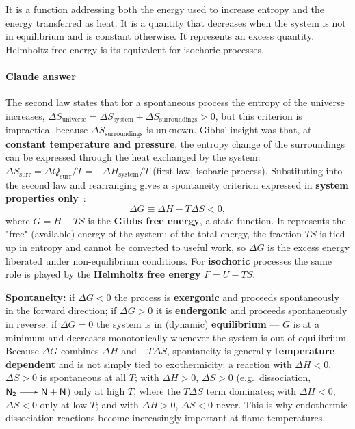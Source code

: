It is a function addressing both the energy used to increase entropy and the energy transferred as heat. It is a quantity that decreases when the system is not in equilibrium and is constant otherwise. It represents an excess quantity. Helmholtz free energy is its equivalent for isochoric processes.

{\color{istblue}
\paragraph{Claude answer}
The second law states that for a spontaneous process the entropy of the universe increases, $\Delta S_{\mathrm{universe}} = \Delta S_{\mathrm{system}} + \Delta S_{\mathrm{surroundings}} > 0$, but this criterion is impractical because $\Delta S_{\mathrm{surroundings}}$ is unknown. Gibbs' insight was that, at \textbf{constant temperature and pressure}, the entropy change of the surroundings can be expressed through the heat exchanged by the system: $\Delta S_{\mathrm{surr}} = \Delta Q_{\mathrm{surr}}/T = -\Delta H_{\mathrm{system}}/T$ (first law, isobaric process). Substituting into the second law and rearranging gives a spontaneity criterion expressed in \textbf{system properties only}~\cite{lecture2}:
\begin{equation*}
\Delta G \equiv \Delta H - T\Delta S < 0,
\end{equation*}
where $G = H - TS$ is the \textbf{Gibbs free energy}, a state function. It represents the "free" (available) energy of the system: of the total energy, the fraction $TS$ is tied up in entropy and cannot be converted to useful work, so $\Delta G$ is the excess energy liberated under non-equilibrium conditions. For \textbf{isochoric} processes the same role is played by the \textbf{Helmholtz free energy} $F = U - TS$.

\textbf{Spontaneity:} if $\Delta G < 0$ the process is \textbf{exergonic} and proceeds spontaneously in the forward direction; if $\Delta G > 0$ it is \textbf{endergonic} and proceeds spontaneously in reverse; if $\Delta G = 0$ the system is in (dynamic) \textbf{equilibrium} --- $G$ is at a minimum and decreases monotonically whenever the system is out of equilibrium. Because $\Delta G$ combines $\Delta H$ and $-T\Delta S$, spontaneity is generally \textbf{temperature dependent} and is not simply tied to exothermicity: a reaction with $\Delta H < 0$, $\Delta S > 0$ is spontaneous at all $T$; with $\Delta H > 0$, $\Delta S > 0$ (e.g.\ dissociation, $\ce{N2 -> N + N}$) only at high $T$, where the $T\Delta S$ term dominates; with $\Delta H < 0$, $\Delta S < 0$ only at low $T$; and with $\Delta H > 0$, $\Delta S < 0$ never. This is why endothermic dissociation reactions become increasingly important at flame temperatures.

}
